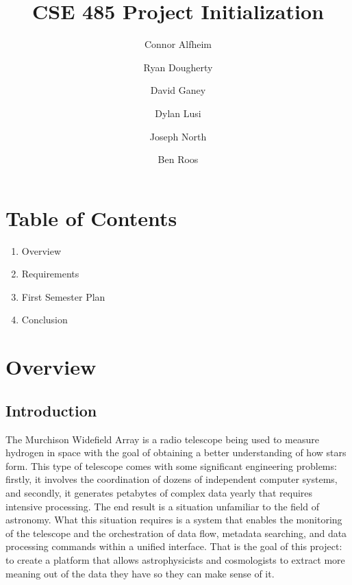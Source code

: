 \documentclass[12pt]{article}
\begin{document}
\begin{spacing}{.4}
\setlength{\droptitle}{-7em}
\title{CSE 485 Project Initialization}
\author{Connor Alfheim \and Ryan Dougherty \and David Ganey \and Dylan Lusi \and Joseph North \and Ben Roos}
\maketitle
\newpage
\end{spacing}

\begin{spacing}{1.5}

\section{Table of Contents}
\begin{enumerate}
\item Overview
\item Requirements
\item First Semester Plan
\item Conclusion
\end{enumerate}
\newpage

\section{Overview}
\subsection{Introduction}
The Murchison Widefield Array is a radio telescope being used to measure hydrogen in space with the goal of obtaining a better understanding of how stars form. This type of telescope comes with some significant engineering problems: firstly, it involves the coordination of dozens of independent computer systems, and secondly, it generates petabytes of complex data yearly that requires intensive processing. The end result is a situation unfamiliar to the field of astronomy. What this situation requires is a system that enables the monitoring of the telescope and the orchestration of data flow, metadata searching, and data processing commands within a unified interface. That is the goal of this project: to create a platform that allows astrophysicists and cosmologists to extract more meaning out of the data they have so they can make sense of it.


\end{spacing}
\end{document}
